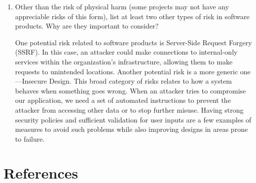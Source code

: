 \documentclass{article}
\begin{document}
\begin{enumerate}
    \item Other than the risk of physical harm (some projects may not have any appreciable risks of this form), list at least two other types of risk in software products. Why are they important to consider? 

    One potential risk related to software products is Server-Side Request Forgery (SSRF). In this case, an attacker could make connections to internal-only services within the organization’s infrastructure, allowing them to make requests to unintended locations. Another potential risk is a more generic one—Insecure Design. This broad category of risks relates to how a system behaves when something goes wrong. When an attacker tries to compromise our application, we need a set of automated instructions to prevent the attacker from accessing other data or to stop further misuse. Having strong security policies and sufficient validation for user inputs are a few examples of measures to avoid such problems while also improving designs in areas prone to failure.
\end{enumerate}

\section{References}
\sloppy
\end{document}
